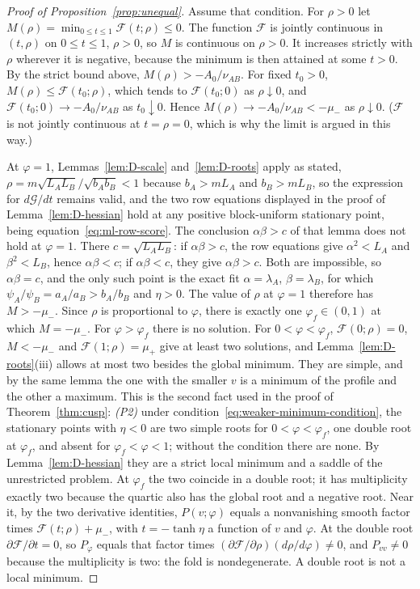 \begin{proof}[Proof of Proposition~\ref{prop:unequal}]
Assume that condition. For $\rho>0$ let $M(\rho)=\min_{0\le t\le1}\mathcal F(t;\rho)\le0$. The function $\mathcal F$ is jointly continuous in $(t,\rho)$ on $0\le t\le1$, $\rho>0$, so $M$ is continuous on $\rho>0$. It increases strictly with $\rho$ wherever it is negative, because the minimum is then attained at some $t>0$. By the strict bound above, $M(\rho)>-A_0/\nu_{AB}$. For fixed $t_0>0$, $M(\rho)\le\mathcal F(t_0;\rho)$, which tends to $\mathcal F(t_0;0)$ as $\rho\downarrow0$, and $\mathcal F(t_0;0)\to-A_0/\nu_{AB}$ as $t_0\downarrow0$. Hence $M(\rho)\to-A_0/\nu_{AB}<-\mu_-$ as $\rho\downarrow0$. ($\mathcal F$ is not jointly continuous at $t=\rho=0$, which is why the limit is argued in this way.)

At $\varphi=1$, Lemmas~\ref{lem:D-scale} and~\ref{lem:D-roots} apply as stated, $\rho=m\sqrt{L_AL_B}/\sqrt{b_Ab_B}<1$ because $b_A>mL_A$ and $b_B>mL_B$, so the expression for $d\mathcal G/dt$ remains valid, and the two row equations displayed in the proof of Lemma~\ref{lem:D-hessian} hold at any positive block-uniform stationary point, being equation~\eqref{eq:ml-row-score}. The conclusion $\alpha\beta>c$ of that lemma does not hold at $\varphi=1$. There $c=\sqrt{L_AL_B}$: if $\alpha\beta>c$, the row equations give $\alpha^2<L_A$ and $\beta^2<L_B$, hence $\alpha\beta<c$; if $\alpha\beta<c$, they give $\alpha\beta>c$. Both are impossible, so $\alpha\beta=c$, and the only such point is the exact fit $\alpha=\lambda_A$, $\beta=\lambda_B$, for which $\psi_A/\psi_B=a_A/a_B>b_A/b_B$ and $\eta>0$. The value of $\rho$ at $\varphi=1$ therefore has $M>-\mu_-$. Since $\rho$ is proportional to $\varphi$, there is exactly one $\varphi_f\in(0,1)$ at which $M=-\mu_-$. For $\varphi>\varphi_f$ there is no solution. For $0<\varphi<\varphi_f$, $\mathcal F(0;\rho)=0$, $M<-\mu_-$ and $\mathcal F(1;\rho)=\mu_+$ give at least two solutions, and Lemma~\ref{lem:D-roots}(iii) allows at most two besides the global minimum. They are simple, and by the same lemma the one with the smaller $v$ is a minimum of the profile and the other a maximum. This is the second fact used in the proof of Theorem~\ref{thm:cusp}: \textit{(P2)} under condition~\eqref{eq:weaker-minimum-condition}, the stationary points with $\eta<0$ are two simple roots for $0<\varphi<\varphi_f$, one double root at $\varphi_f$, and absent for $\varphi_f<\varphi<1$; without the condition there are none. By Lemma~\ref{lem:D-hessian} they are a strict local minimum and a saddle of the unrestricted problem. At $\varphi_f$ the two coincide in a double root; it has multiplicity exactly two because the quartic also has the global root and a negative root. Near it, by the two derivative identities, $P(v;\varphi)$ equals a nonvanishing smooth factor times $\mathcal F(t;\rho)+\mu_-$, with $t=-\tanh\eta$ a function of $v$ and $\varphi$. At the double root $\partial\mathcal F/\partial t=0$, so $P_\varphi$ equals that factor times $(\partial\mathcal F/\partial\rho)(d\rho/d\varphi)\ne0$, and $P_{vv}\ne0$ because the multiplicity is two: the fold is nondegenerate. A double root is not a local minimum.


\end{proof}
